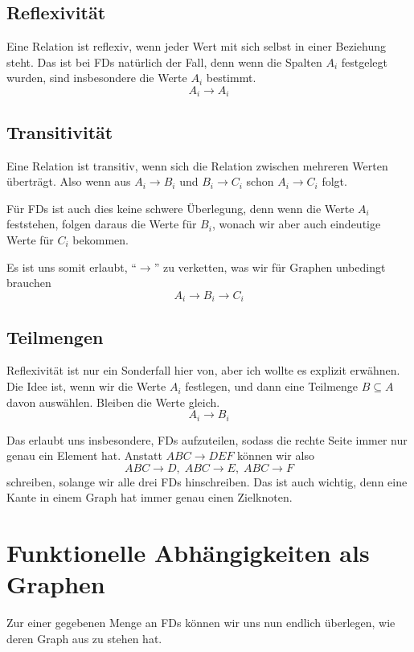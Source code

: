 \documentclass[a4paper, ngerman]{article}
\begin{document}
\subsection*{Reflexivität}
Eine Relation ist reflexiv,
wenn jeder Wert mit sich selbst in einer Beziehung steht.
Das ist bei FDs natürlich der Fall,
denn wenn die Spalten $A_i$ festgelegt wurden,
sind insbesondere die Werte $A_i$ bestimmt.
$$
    A_i \to A_i
$$

\subsection*{Transitivität}
Eine Relation ist transitiv,
wenn sich die Relation zwischen mehreren Werten überträgt.
Also wenn aus $A_i \to B_i$ und $B_i \to C_i$ schon $A_i \to C_i$ folgt.

Für FDs ist auch dies keine schwere Überlegung,
denn wenn die Werte $A_i$ feststehen,
folgen daraus die Werte für $B_i$,
wonach wir aber auch eindeutige Werte für $C_i$ bekommen.

Es ist uns somit erlaubt,
\enquote{$\to$} zu verketten,
was wir für Graphen unbedingt brauchen
$$
    A_i \to B_i \to C_i
$$

\subsection*{Teilmengen}
Reflexivität ist nur ein Sonderfall hier von,
aber ich wollte es explizit erwähnen.
Die Idee ist, wenn wir die Werte $A_i$ festlegen,
und dann eine Teilmenge $B \subseteq A$ davon auswählen.
Bleiben die Werte gleich.
$$
    A_i \to B_i
$$

Das erlaubt uns insbesondere,
FDs aufzuteilen, sodass die rechte Seite
immer nur genau ein Element hat.
Anstatt $ABC \to DEF$ können wir also
$$
    ABC \to D,\;
    ABC \to E,\;
    ABC \to F
$$
schreiben, solange wir alle drei FDs hinschreiben.
Das ist auch wichtig, denn eine Kante
in einem Graph hat immer genau einen Zielknoten.

\section*{Funktionelle Abhängigkeiten als Graphen}
Zur einer gegebenen Menge an FDs können
wir uns nun endlich überlegen,
wie deren Graph aus zu stehen hat.
\end{document}

